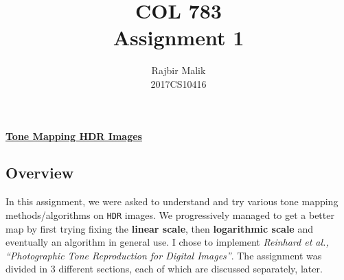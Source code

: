 \documentclass{article}
\title{COL 783 \\ Assignment 1}
\author{Rajbir Malik \\ 2017CS10416}
\begin{document}
    
    \maketitle
    
    \begin{center}
    \Large{\underline{\textbf{Tone Mapping HDR Images}}}
    \end{center}
    \subsection*{Overview}
    In this assignment, we were asked to understand and try various tone mapping methods/algorithms on \texttt{HDR} images. We progressively managed to get a better map by first trying fixing the \textbf{linear scale}, then \textbf{logarithmic scale} and eventually an algorithm in general use. I chose to implement {\small \textit{Reinhard et al., “Photographic Tone Reproduction for Digital Images”}}.
    The assignment was divided in 3 different sections, each of which are discussed separately, later.
    
    \pagebreak
\end{document}
